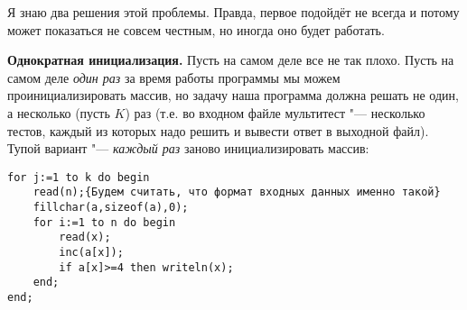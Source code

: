 
Я знаю два решения этой проблемы. Правда, первое подойдёт не всегда и потому может показаться не 
совсем честным, но иногда оно будет работать.

\textbf{Однократная инициализация.} Пусть на самом деле все не так плохо. Пусть на самом деле 
\textit{один раз} за время работы программы мы можем проинициализировать массив, но задачу наша 
программа должна решать не один, а несколько (пусть $K$) раз (т.е. во входном файле мультитест "--- несколько тестов, каждый из которых надо решить и вывести ответ в выходной файл). Тупой вариант "--- \textit{каждый раз} 
заново инициализировать массив:
\begin{codesampleo}\begin{verbatim}
for j:=1 to k do begin
    read(n);{Будем считать, что формат входных данных именно такой}
    fillchar(a,sizeof(a),0);
    for i:=1 to n do begin
        read(x);
        inc(a[x]);
        if a[x]>=4 then writeln(x);
    end;
end;
\end{verbatim}\end{codesampleo}


